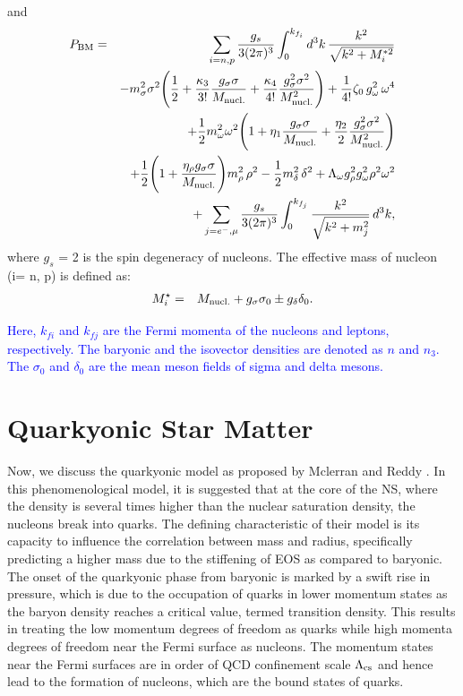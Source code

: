 and
\begin{eqnarray}
	\label{eq:press}
	P_{\rm BM}& = & \sum_{i=n,p} \frac{g_s}{3 (2\pi)^{3}}\int_{0}^{k_{f_{i}}} d^{3}k\, \frac{k^2}{\sqrt{k^{2} + M_{i}^{*2} }} \nonumber\\
	&& - m_{\sigma}^2{\sigma}^2\Bigg(\frac{1}{2} + \frac{\kappa_{3}}{3!}\frac{g_\sigma\sigma}{M_{\rm nucl.}} + \frac{\kappa_4}{4!}\frac{g_\sigma^2\sigma^2}{M_{\rm nucl.}^2}\Bigg)+ \frac{1}{4!}\zeta_{0}\,{g_{\omega}^2}\,\omega^4 
	\nonumber\\
	&&
	+\frac{1}{2}m_{\omega}^2\omega^2\Bigg(1+\eta_{1}\frac{g_\sigma\sigma}{M_{\rm nucl.}}+\frac{\eta_{2}}{2}\frac{g_\sigma^2\sigma^2}{M_{\rm nucl.}^2}\Bigg)
	\nonumber\\
	&&
	+ \frac{1}{2}\Bigg(1+\frac{\eta_{\rho}g_\sigma\sigma}{M_{\rm nucl.}}\Bigg)m_{\rho}^2\,\rho^{2}-\frac{1}{2}m_{\delta}^2\, \delta^{2}+\Lambda_{\omega} g_\rho^2 g_\omega^2 \rho^2 \omega^2
	\nonumber\\
	&&
	+\sum_{j=e^{-}, \mu}  \frac{g_s}{3(2\pi)^{3}}\int_{0}^{k_{f_{j}}} \frac{k^2}{\sqrt{k^2 + m^2_{j}}} \, d^{3}k,
\end{eqnarray}
where $g_s$ = 2 is the spin degeneracy of nucleons. The effective mass of nucleon (i= n, p) is defined as: 
\begin{eqnarray}
	M_{i}^\star &=& M_{\rm nucl.}+ g_\sigma \sigma_0 \pm g_\delta \delta_0 .
	\label{eq:effm_nucleon}
\end{eqnarray}

\noindent
\textcolor{blue}{Here, $k_{fi}$ and $k_{fj}$ are the Fermi momenta of the nucleons and leptons, respectively. The  baryonic and the isovector densities are denoted as $n$ and $n_3$. The $\sigma_0$ and $\delta_0$ are the mean meson fields of sigma and delta mesons.} 


\section{Quarkyonic Star Matter}
Now, we discuss the quarkyonic model as proposed by Mclerran and Reddy \cite{PhysRevLett.122.122701}. In this phenomenological model, it is suggested that at the core of the NS, where the density is several times higher than the nuclear saturation density, the nucleons break into quarks. The defining characteristic of their model is its capacity to influence the correlation between mass and radius, specifically predicting a higher mass due to the stiffening of EOS as compared to baryonic. The onset of the quarkyonic phase from baryonic is marked by a swift rise in pressure, which is due to the occupation of quarks in lower momentum states as the baryon density reaches a critical value, termed transition density. This results in treating the low momentum degrees of freedom as quarks while high momenta degrees of freedom near the Fermi surface as nucleons. The momentum states near the Fermi surfaces are in order of QCD confinement scale $\Lambda_{\rm cs}$ and hence lead to the formation of nucleons, which are the bound states of quarks.


